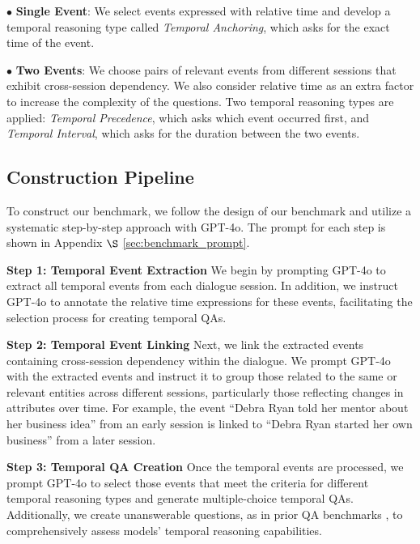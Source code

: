$\bullet$ \textbf{Single Event}: We select events expressed with relative time and develop a temporal reasoning type called \textit{Temporal Anchoring}, which asks for the exact time of the event.

$\bullet$ \textbf{Two Events}: We choose pairs of relevant events from different sessions that exhibit cross-session dependency. We also consider relative time as an extra factor to increase the complexity of the questions. Two temporal reasoning types are applied: \textit{Temporal Precedence}, which asks which event occurred first, and \textit{Temporal Interval}, which asks for the duration between the two events.

\subsection{Construction Pipeline}
To construct our benchmark, we follow the design of our benchmark and utilize a systematic step-by-step approach with GPT-4o. 
The prompt for each step is shown in Appendix $\S$ \ref{sec:benchmark_prompt}.

\noindent \textbf{Step 1: Temporal Event Extraction}
We begin by prompting GPT-4o to extract all temporal events from each dialogue session. In addition, we instruct GPT-4o to annotate the relative time expressions for these events, facilitating the selection process for creating temporal QAs.

\noindent \textbf{Step 2: Temporal Event Linking}
Next, we link the extracted events containing cross-session dependency within the dialogue. We prompt GPT-4o with the extracted events and instruct it to group those related to the same or relevant entities across different sessions, particularly those reflecting changes in attributes over time. For example, the event “Debra Ryan told her mentor about her business idea” from an early session is linked to “Debra Ryan started her own business” from a later session.

\noindent \textbf{Step 3: Temporal QA Creation}
Once the temporal events are processed, we prompt GPT-4o to select those events that meet the criteria for different temporal reasoning types and generate multiple-choice temporal QAs. Additionally, we create unanswerable questions, as in prior QA benchmarks \cite{rajpurkar2018know}, to comprehensively assess models' temporal reasoning capabilities.

